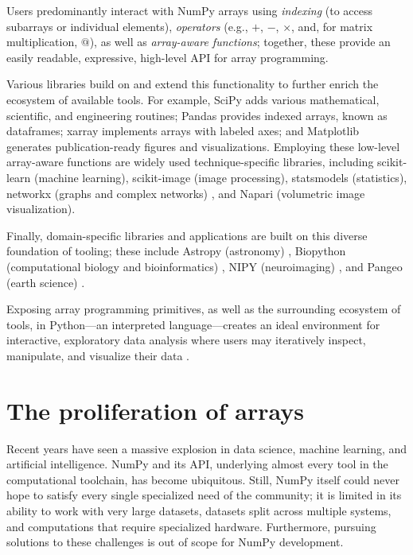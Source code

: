 Users predominantly interact with NumPy arrays using {\em indexing} (to access
subarrays or individual elements), {\em operators} (e.g., $+$, $-$, $\times$,
and, for matrix multiplication, $@$), as well as {\em array-aware functions};
together, these provide an easily readable, expressive, high-level API for
array programming.

Various libraries build on and extend this functionality to further enrich the
ecosystem of available tools.  For example, SciPy adds various mathematical,
scientific, and engineering routines; Pandas provides indexed arrays, known as
dataframes; xarray implements arrays with labeled axes; and Matplotlib
generates publication-ready figures and visualizations.  Employing these
low-level array-aware functions are widely used technique-specific libraries,
including scikit-learn (machine learning), scikit-image (image processing),
statsmodels (statistics),  networkx (graphs and complex networks)
\cite{SciPyProceedings_11}, and Napari (volumetric image visualization).

Finally, domain-specific libraries and applications are built on this diverse
foundation of tooling; these include Astropy (astronomy) \cite{astropy:2013,
astropy:2018}, Biopython (computational biology and bioinformatics) \cite{cock2009biopython},
NIPY (neuroimaging) \cite{millman2007analysis}, and Pangeo (earth science) \cite{2018EGUGA..2012146H}.

Exposing array programming primitives, as well as the surrounding ecosystem of
tools, in Python---an interpreted language---creates an ideal environment for
interactive, exploratory data analysis where users may iteratively inspect,
manipulate, and visualize their data \cite{perez2007ipython}.

\section*{The proliferation of arrays}


Recent years have seen a massive explosion in data science, machine learning,
and artificial intelligence.  NumPy and its API, underlying almost every tool
in the computational toolchain, has become ubiquitous.  Still, NumPy itself
could never hope to satisfy every single specialized need of the community; it
is limited in its ability to work with very large datasets, datasets split
across multiple systems, and computations that require specialized hardware.
Furthermore, pursuing solutions to these challenges is out of scope for NumPy
development.


